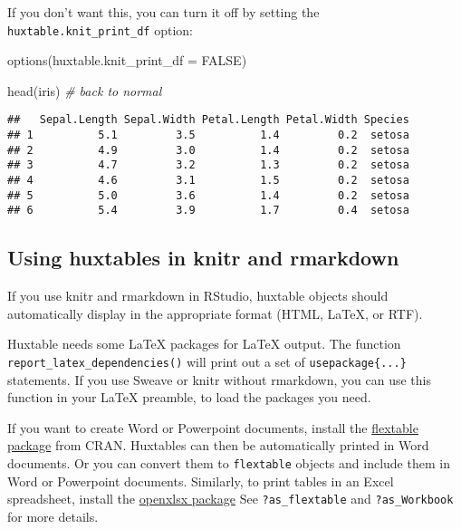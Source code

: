\documentclass[
]{article}
\newenvironment{Shaded}{\begin{snugshade}}{\end{snugshade}}
\newcommand{\AttributeTok}[1]{\textcolor[rgb]{0.77,0.63,0.00}{#1}}
\newcommand{\CommentTok}[1]{\textcolor[rgb]{0.56,0.35,0.01}{\textit{#1}}}
\newcommand{\ConstantTok}[1]{\textcolor[rgb]{0.00,0.00,0.00}{#1}}
\newcommand{\FunctionTok}[1]{\textcolor[rgb]{0.00,0.00,0.00}{#1}}
\newcommand{\NormalTok}[1]{#1}
\begin{document}
\FloatBarrier

If you don't want this, you can turn it off by setting the
\texttt{huxtable.knit\_print\_df} option:

\begin{Shaded}
\begin{Highlighting}[]
\FunctionTok{options}\NormalTok{(}\AttributeTok{huxtable.knit\_print\_df =} \ConstantTok{FALSE}\NormalTok{)}

\FunctionTok{head}\NormalTok{(iris) }\CommentTok{\# back to normal}
\end{Highlighting}
\end{Shaded}

\begin{verbatim}
##   Sepal.Length Sepal.Width Petal.Length Petal.Width Species
## 1          5.1         3.5          1.4         0.2  setosa
## 2          4.9         3.0          1.4         0.2  setosa
## 3          4.7         3.2          1.3         0.2  setosa
## 4          4.6         3.1          1.5         0.2  setosa
## 5          5.0         3.6          1.4         0.2  setosa
## 6          5.4         3.9          1.7         0.4  setosa
\end{verbatim}

\FloatBarrier

\hypertarget{using-huxtables-in-knitr-and-rmarkdown}{%
\subsection{Using huxtables in knitr and
rmarkdown}\label{using-huxtables-in-knitr-and-rmarkdown}}

If you use knitr and rmarkdown in RStudio, huxtable objects should
automatically display in the appropriate format (HTML, LaTeX, or RTF).

Huxtable needs some LaTeX packages for LaTeX output. The function
\texttt{report\_latex\_dependencies()} will print out a set of
\texttt{usepackage\{...\}} statements. If you use Sweave or knitr
without rmarkdown, you can use this function in your LaTeX preamble, to
load the packages you need.

If you want to create Word or Powerpoint documents, install the
\href{https://cran.r-project.org/package=flextable}{flextable package}
from CRAN. Huxtables can then be automatically printed in Word
documents. Or you can convert them to \texttt{flextable} objects and
include them in Word or Powerpoint documents. Similarly, to print tables
in an Excel spreadsheet, install the
\href{https://cran.r-project.org/package=openxlsx}{openxlsx package} See
\texttt{?as\_flextable} and \texttt{?as\_Workbook} for more details.
\end{document}
